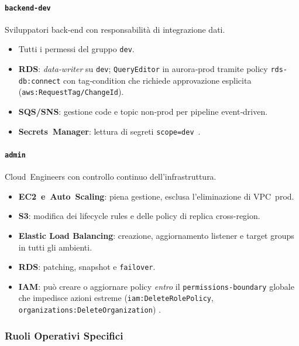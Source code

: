 \documentclass[a4paper,12pt]{report}
\begin{document}
\paragraph{\texttt{backend‑dev}}%
Sviluppatori back‑end con responsabilità di integrazione dati.  
\begin{itemize}
  \item Tutti i permessi del gruppo \texttt{dev}.  
  \item \textbf{RDS}: \emph{data‑writer} su \texttt{dev}; \texttt{QueryEditor} in aurora‑prod tramite
        policy \texttt{rds-db:connect} con tag‑condition che richiede
        approvazione esplicita (\texttt{aws:RequestTag/ChangeId}).  
  \item \textbf{SQS/SNS}: gestione code e topic non‑prod per pipeline event‑driven.  
  \item \textbf{Secrets Manager}: lettura di segreti \texttt{scope=dev} \cite{AWSIAMBestPractices}.  
\end{itemize}

\paragraph{\texttt{admin}}%
Cloud Engineers con controllo continuo dell’infrastruttura.  
\begin{itemize}
  \item \textbf{EC2 e Auto Scaling}: piena gestione, esclusa l’eliminazione di VPC prod.  
  \item \textbf{S3}: modifica dei lifecycle rules e delle policy di replica cross-region.
  
  \item \textbf{Elastic Load Balancing}: creazione, aggiornamento listener e target groups in tutti gli ambienti.
  
  \item \textbf{RDS}: patching, snapshot e \texttt{failover}.
  
  \item \textbf{IAM}: può creare o aggiornare policy \emph{entro} il \texttt{permissions-boundary} globale che impedisce azioni estreme (\texttt{iam:DeleteRolePolicy}, \texttt{organizations:DeleteOrganization}) \cite{AWSPermBoundaries}.
\end{itemize}

\subsubsection{Ruoli Operativi Specifici}
\label{subsubsec:ruoli_specifici}
\end{document}
